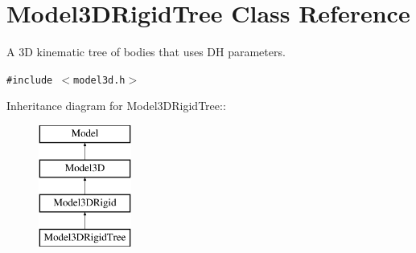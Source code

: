 \section{Model3DRigid\-Tree  Class Reference}
\label{classModel3DRigidTree}
A 3D kinematic tree of bodies that uses DH parameters. 


{\tt \#include $<$model3d.h$>$}

Inheritance diagram for Model3DRigid\-Tree::\begin{figure}[H]
\begin{center}
\leavevmode
\includegraphics[height=4cm]{classModel3DRigidTree}
\end{center}
\end{figure}
